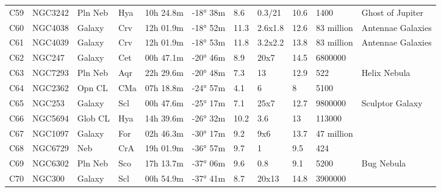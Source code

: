 \begin{table}[h]
\begin{tabular}{@{}lllllllllll@{}}
C59        & NGC3242     & Pln Neb    & Hya       & 10h 24.8m & -18° 38m  & 8.6       & 0.3/21               & 10.6     & 1400                & Ghost of Jupiter                \\
C60        & NGC4038     & Galaxy     & Crv       & 12h 01.9m & -18° 52m  & 11.3      & 2.6x1.8              & 12.6     & 83 million          & Antennae Galaxies               \\
C61        & NGC4039     & Galaxy     & Crv       & 12h 01.9m & -18° 53m  & 11.8      & 3.2x2.2              & 13.8     & 83 million          & Antennae Galaxies               \\
C62        & NGC247      & Galaxy     & Cet       & 00h 47.1m & -20° 46m  & 8.9       & 20x7                 & 14.5     & 6800000             &                                 \\
C63        & NGC7293     & Pln Neb    & Aqr       & 22h 29.6m & -20° 48m  & 7.3       & 13                   & 12.9     & 522                 & Helix Nebula                    \\
C64        & NGC2362     & Opn CL     & CMa       & 07h 18.8m & -24° 57m  & 4.1       & 6                    & 8        & 5100                &                                 \\
C65        & NGC253      & Galaxy     & Scl       & 00h 47.6m & -25° 17m  & 7.1       & 25x7                 & 12.7     & 9800000             & Sculptor Galaxy                 \\
C66        & NGC5694     & Glob CL    & Hya       & 14h 39.6m & -26° 32m  & 10.2      & 3.6                  & 13       & 113000              &                                 \\
C67        & NGC1097     & Galaxy     & For       & 02h 46.3m & -30° 17m  & 9.2       & 9x6                  & 13.7     & 47 million          &                                 \\
C68        & NGC6729     & Neb        & CrA       & 19h 01.9m & -36° 57m  & 9.7       & 1                    & 9.5      & 424                 &                                 \\
C69        & NGC6302     & Pln Neb    & Sco       & 17h 13.7m & -37° 06m  & 9.6       & 0.8                  & 9.1      & 5200                & Bug Nebula                      \\
C70        & NGC300      & Galaxy     & Scl       & 00h 54.9m & -37° 41m  & 8.7       & 20x13                & 14.8     & 3900000             &                                 \\

\end{tabular}
\end{table}
